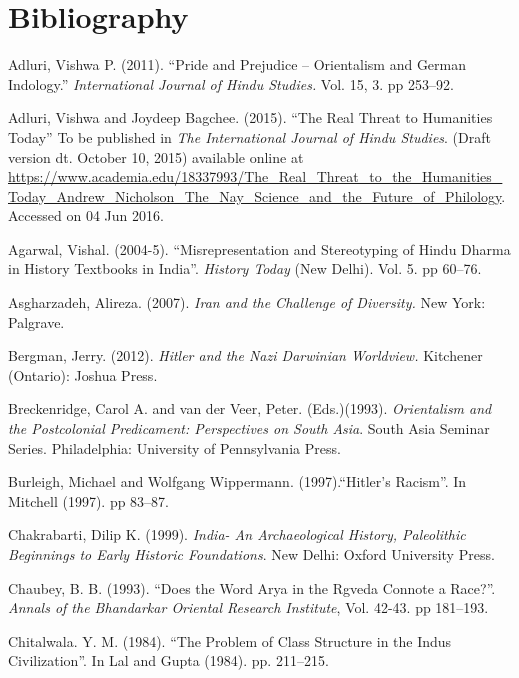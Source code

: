\section*{Bibliography}

\begin{thebibliography}{99}
\itemsep=0pt
 Adluri, Vishwa P. (2011). “Pride and Prejudice – Orientalism and German Indology.” \textit{International Journal of Hindu Studies.} Vol. 15, 3. pp 253--92.

  Adluri, Vishwa and Joydeep Bagchee. (2015). “The Real Threat to Humanities Today” To be published in \textit{The International Journal of Hindu Studies}. (Draft version dt. October 10, 2015) available online at \url{https://www.academia.edu/18337993/The_Real_Threat_to_the_Humanities_Today_Andrew_Nicholson_The_Nay_Science_and_the_Future_of_Philology}. Accessed on 04 Jun 2016.

  Agarwal, Vishal. (2004-5). “Misrepresentation and Stereotyping of Hindu Dharma in History Textbooks in India”. \textit{History Today} (New Delhi). Vol. 5. pp 60--76.

  Asgharzadeh, Alireza. (2007). \textit{Iran and the Challenge of Diversity. }New York: Palgrave.

  Bergman, Jerry. (2012). \textit{Hitler and the Nazi Darwinian Worldview.} Kitchener (Ontario): Joshua Press.

  Breckenridge, Carol A. and van der Veer, Peter. (Eds.)(1993). \textit{Orientalism and the Postcolonial Predicament: Perspectives on South Asia}. South Asia Seminar Series. Philadelphia: University of Pennsylvania Press.

  Burleigh, Michael and Wolfgang Wippermann. (1997).“Hitler’s Racism”. In Mitchell (1997). pp 83--87.

  Chakrabarti, Dilip K. (1999). \textit{India- An Archaeological History, Paleolithic Beginnings to Early Historic Foundations}. New Delhi: Oxford University Press.

  Chaubey, B. B. (1993). “Does the Word Arya in the Rgveda Connote a Race?”. \textit{Annals of the Bhandarkar Oriental Research Institute}, Vol. 42-43. pp 181--193.

  Chitalwala. Y. M. (1984). “The Problem of Class Structure in the Indus Civilization”. In Lal and Gupta (1984). pp. 211--215.


\end{thebibliography}
